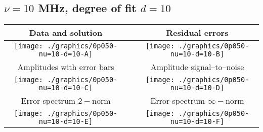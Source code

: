 

% 

\clearpage{}
\break{}

\subsection{$\nu = 10$ MHz, degree of fit $d = 10$}

\begin{table}[h]
    \begin{center}
        \begin{tabular}{ccc}
            Data and solution & \quad & Residual errors \\\hline
            \texttt{[image: ./graphics/0p050-nu=10-d=10-A]} &&
            \texttt{[image: ./graphics/0p050-nu=10-d=10-B]} \\[15pt]
            Amplitudes with error bars && Amplitude signal--to--noise \\\hline
            \texttt{[image: ./graphics/0p050-nu=10-d=10-C]} &&
            \texttt{[image: ./graphics/0p050-nu=10-d=10-D]} \\[15pt]
            Error spectrum $2-$norm && Error spectrum $\infty-$norm \\\hline
            \texttt{[image: ./graphics/0p050-nu=10-d=10-E]} &&
            \texttt{[image: ./graphics/0p050-nu=10-d=10-F]} \\[15pt]
        \end{tabular}
    \end{center}
\label{fig:elev=50, nu=10}
\end{table}



\endinput
